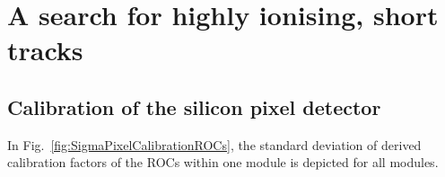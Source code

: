 \chapter{\texorpdfstring{A search for highly ionising, short tracks}{Appendix: \quad A search for highly ionising, short tracks}}
\section{Calibration of the silicon pixel detector}
\label{app:PixelCalibration}
In Fig.~\ref{fig:SigmaPixelCalibrationROCs}, the standard deviation of derived calibration factors of the ROCs within one module is depicted for all modules.
